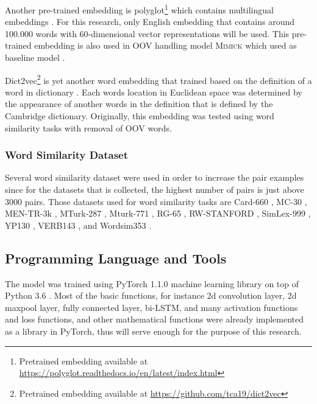             Another pre-trained embedding is
            polyglot\footnote{Pretrained embedding available at
            \url{https://polyglot.readthedocs.io/en/latest/index.html}}
             which contains multilingual embeddings
            \citep{polyglot2013alrfou}. For this research, only
            English embedding that contains around 100.000 words with
            60-dimensional vector representations will be used. This
            pre-trained embedding is also used in OOV handling model
            \textsc{Mimick} which used as baseline model
            \citep{mimicking2017Pinter}.

            Dict2vec\footnote{Pretrained embedding available at
            \url{https://github.com/tca19/dict2vec}} is yet another word
            embedding that trained based on the definition of a word in
            dictionary \citep{dict2vect2017tissier}. Each words
            location in Euclidean space was determined by the
            appearance of another words in the definition that is
            defined by the Cambridge dictionary. Originally, this
            embedding was tested using word similarity tasks with
            removal of OOV words.

        \subsubsection{Word Similarity Dataset}
            Several word similarity dataset were used in order to
            increase the pair examples since for the datasets that is
            collected, the highest number of pairs is just above 3000
            pairs. Those datasets used for word similarity tasks are
            Card-660 \citep{card660:pilehvar-etal:2018}, MC-30
            \citep{mc30:strongContextualHypothesis}, MEN-TR-3k
            \citep{mentr3k:bruni-etal-2012-distributional}, MTurk-287
            \citep{mturk287:Radinsky:2011:WTC:1963405.1963455},
            Mturk-771
            \citep{mturk771:Halawi:2012:LLW:2339530.2339751}, RG-65
            \citep{rg65:Rubenstein:1965:CCS:365628.365657},
            RW-STANFORD \citep{rw:luong-etal-2013-better}, SimLex-999
            \citep{simlex999:hill2014}, YP130
            \citep{yp130:inproceedings}, VERB143
            \citep{vp143:baker-etal-2014-unsupervised}, and Wordsim353
            \citep{wordsim353:2002:PSC:503104.503110}.

    \subsection{Programming Language and Tools}
        The model was trained using PyTorch 1.1.0 machine learning
        library on top of Python 3.6 \citep{pytorch2017paszke}. Most
        of the basic functions, for instance 2d convolution layer, 2d
        maxpool layer, fully connected layer, bi-LSTM, and many
        activation functions and loss functions, and other mathematical
        functions were already implemented as a library in PyTorch,
        thus will serve enough for the purpose of this research.
            

